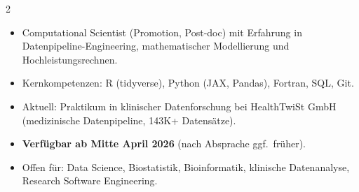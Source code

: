 \documentclass{thejus_cv}
\begin{document}
\begin{paracol}{2}


\begin{itemize}[label=\textbullet, leftmargin=1em]
    \item Computational Scientist (Promotion, Post-doc) mit Erfahrung in Datenpipeline-Engineering, mathematischer Modellierung und Hochleistungsrechnen.
    \item Kernkompetenzen: R (tidyverse), Python (JAX, Pandas), Fortran, SQL, Git.
    \item Aktuell: Praktikum in klinischer Datenforschung bei HealthTwiSt GmbH (medizinische Datenpipeline, 143K+ Datens\"atze).
    \item \textbf{Verf\"ugbar ab Mitte April 2026} (nach Absprache ggf.\ fr\"uher).
    \item Offen f\"ur: Data Science, Biostatistik, Bioinformatik, klinische Datenanalyse, Research Software Engineering.
\end{itemize}



\end{paracol}
\end{document}
